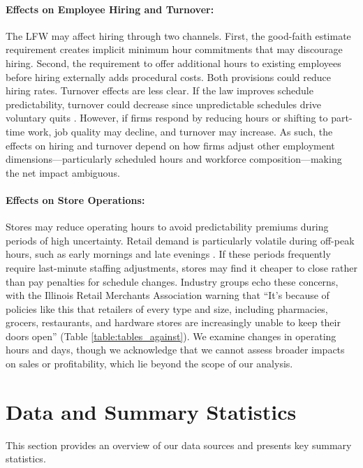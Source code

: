 \documentclass[letterpaper,11pt,leqno]{article}
\theoremstyle{paper}
\begin{document}
\paragraph{Effects on Employee Hiring and Turnover:}
The LFW may affect hiring through two channels. First, the good-faith estimate requirement creates implicit minimum hour commitments that may discourage hiring. Second, the requirement to offer additional hours to existing employees before hiring externally adds procedural costs. Both provisions could reduce hiring rates. Turnover effects are less clear. If the law improves schedule predictability, turnover could decrease since unpredictable schedules drive voluntary quits \citep{schneider2019consequences,lambert_predictability}. However, if firms respond by reducing hours or shifting to part-time work, job quality may decline, and turnover may increase. As such, the effects on hiring and turnover depend on how firms adjust other employment dimensions—particularly scheduled hours and workforce composition—making the net impact ambiguous. 


\paragraph{Effects on Store Operations:}
Stores may reduce operating hours to avoid predictability premiums during periods of high uncertainty. Retail demand is particularly volatile during off-peak hours, such as early mornings and late evenings \citep{netessine_traffic,kesavan_traffic}. If these periods frequently require last-minute staffing adjustments, stores may find it cheaper to close rather than pay penalties for schedule changes. Industry groups echo these concerns, with the Illinois Retail Merchants Association warning that ``It's because of policies like this that retailers of every type and size, including pharmacies, grocers, restaurants, and hardware stores are increasingly unable to keep their doors open'' (Table \ref{table:tables_against}). We examine changes in operating hours and days, though we acknowledge that we cannot assess broader impacts on sales or profitability, which lie beyond the scope of our analysis.
\section{Data and Summary Statistics} \label{sec:data}

This section provides an overview of our data sources and presents key summary statistics. 
\end{document}

